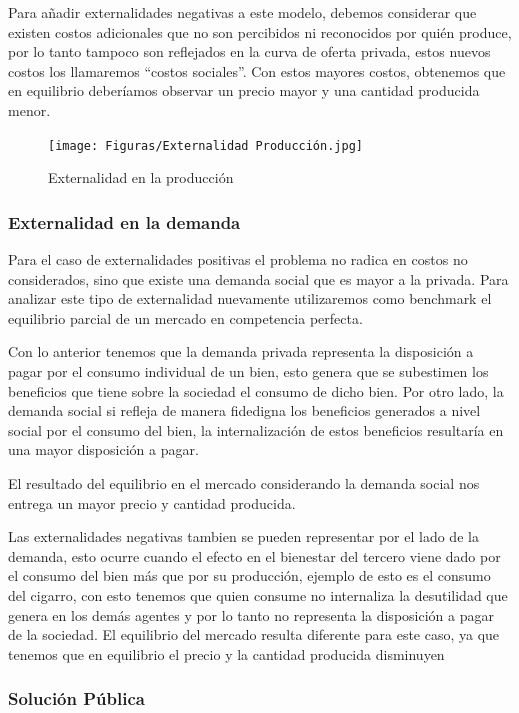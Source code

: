 Para añadir externalidades negativas a este modelo, debemos considerar que existen costos adicionales que no son percibidos ni reconocidos por quién produce, por lo tanto tampoco son reflejados en la curva de oferta privada, estos nuevos costos los llamaremos ``costos sociales''. Con estos mayores costos, obtenemos que en equilibrio deberíamos observar un precio mayor y una cantidad producida menor.

\begin{figure}[h]
    \centering
    \caption{Externalidad en la producción}
    \texttt{[image: Figuras/Externalidad Producción.jpg]}
    \label{fig:Ext. Producción}
\end{figure}

\subsubsection{Externalidad en la demanda}

Para el caso de externalidades positivas el problema no radica en costos no considerados, sino que existe una demanda social que es mayor a la privada. Para analizar este tipo de externalidad nuevamente utilizaremos como benchmark el equilibrio parcial de un mercado en competencia perfecta.

Con lo anterior tenemos que la demanda privada representa la disposición a pagar por el consumo individual de un bien, esto genera que se subestimen los beneficios que tiene sobre la sociedad el consumo de dicho bien. Por otro lado, la demanda social si refleja de manera fidedigna los beneficios generados a nivel social por el consumo del bien, la internalización de estos beneficios resultaría en una mayor disposición a pagar.

El resultado del equilibrio en el mercado considerando la demanda social nos entrega un mayor precio y cantidad producida.

Las externalidades negativas tambien se pueden representar por el lado de la demanda, esto ocurre cuando el efecto en el bienestar del tercero viene dado por el consumo del bien más que por su producción, ejemplo de esto es el consumo del cigarro, con esto tenemos que quien consume no internaliza la desutilidad que genera en los demás agentes y por lo tanto no representa la disposición a pagar de la sociedad. El equilibrio del mercado resulta diferente para este caso, ya que tenemos que en equilibrio el precio y la cantidad producida disminuyen

\subsubsection{Solución Pública}

